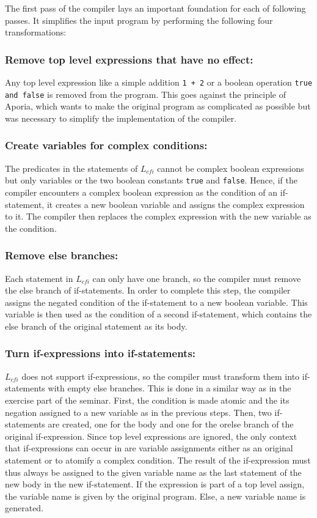 The first pass of the compiler lays an important foundation for each of following passes. It simplifies the input program by performing the following four transformations:

\subsubsection{Remove top level expressions that have no effect:}
Any top level expression like a simple addition \texttt{1 + 2} or a boolean operation \texttt{true and false} is removed from the program.
This goes against the principle of Aporia, which wants to make the original program as complicated as possible but was necessary to simplify the implementation of the compiler.

\subsubsection{Create variables for complex conditions:}
The predicates in the statements of $L_{cfi}$ cannot be complex boolean expressions but only variables or the two boolean constants \texttt{true} and \texttt{false}.
Hence, if the compiler encounters a complex boolean expression as the condition of an if-statement, it creates a new boolean variable and assigns the complex expression to it. 
The compiler then replaces the complex expression with the new variable as the condition.

\subsubsection{Remove else branches:}
Each statement in $L_{cfi}$ can only have one branch, so the compiler must remove the else branch of if-statements.
In order to complete this step, the compiler assigns the negated condition of the if-statement to a new boolean variable.
This variable is then used as the condition of a second if-statement, which contains the else branch of the original statement as its body.

\subsubsection{Turn if-expressions into if-statements:}
$L_{cfi}$ does not support if-expressions, so the compiler must transform them into if-statements with empty else branches. This is done in a similar way as in the exercise part of the seminar.
First, the condition is made atomic and the its negation assigned to a new variable as in the previous steps.
Then, two if-statements are created, one for the body and one for the orelse branch of the original if-expression.
Since top level expressions are ignored, the only context that if-expressions can occur in are variable assignments either as an original statement or to atomify a complex condition.
The result of the if-expression must thus always be assigned to the given variable name as the last statement of the new body in the new if-statement.
If the expression is part of a top level assign, the variable name is given by the original program. Else, a new variable name is generated.


